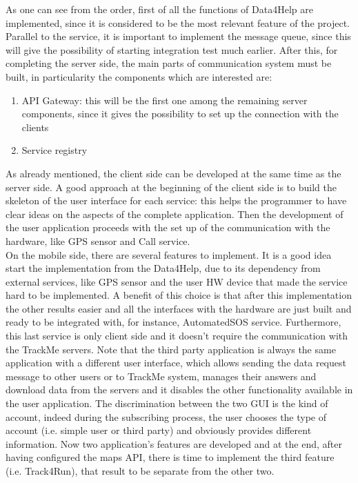 As one can see from the order, first of all the functions of Data4Help are implemented, since it is
considered to be the most relevant feature of the project. \\ 
Parallel to the service, it is important to implement the message queue, since this will give the 
possibility of starting integration test much earlier. 
 After this, for completing the server side, the main parts of communication system must be built, in
particularity the components which are interested are: 
\begin{enumerate}
\item API Gateway: this will be the first one among the remaining server components, since it gives the possibility to set up the connection with the clients
\item Service registry
\end{enumerate}
\par
As already mentioned, the client side can be developed at the same time as the server side. 
A good approach at the beginning of the client side is to build the skeleton of the user interface for each service: this helps the programmer
to have clear ideas on the aspects of the complete application. 
Then the development of the user application proceeds with the set up of the communication with the hardware,
like GPS sensor and Call service. \\
On the mobile side, there are several features to implement. It is a good idea start the implementation from the Data4Help, due to its
dependency from external services, like GPS sensor and the user HW device that made the service hard to be implemented.
A benefit of this choice is that after this implementation the other results easier and all the interfaces with the hardware are just built
and ready to be integrated with, for instance, AutomatedSOS service. 
Furthermore, this last service is only client side and it doesn't require the communication with the
TrackMe servers. 
Note that the third party application is always the same application with a different user interface, which allows sending
the data request message to other users or to TrackMe system, manages their answers and download data from the servers and it disables the
other functionality available in the user application. The discrimination between the two GUI is the kind of account, indeed during the
subscribing process, the user chooses the type of account (i.e. simple user or third party) and obviously provides different information. Now
two application's features are developed and at the end, after having configured the maps API, there is time to implement the third feature
(i.e. Track4Run), that result to be separate from the other two.